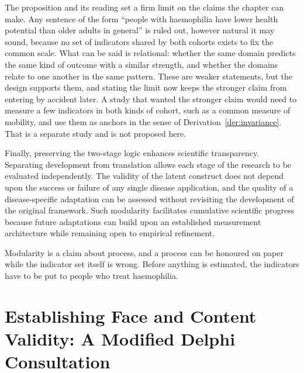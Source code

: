 The proposition and its reading set a firm limit on the claims the chapter can make. Any sentence of the form ``people with haemophilia have lower health potential than older adults in general'' is ruled out, however natural it may sound, because no set of indicators shared by both cohorts exists to fix the common scale. What can be said is relational: whether the same domain predicts the same kind of outcome with a similar strength, and whether the domains relate to one another in the same pattern. These are weaker statements, but the design supports them, and stating the limit now keeps the stronger claim from entering by accident later. A study that wanted the stronger claim would need to measure a few indicators in both kinds of cohort, such as a common measure of mobility, and use them as anchors in the sense of Derivation~\ref{der:invariance}. That is a separate study and is not proposed here.

Finally, preserving the two-stage logic enhances scientific transparency. Separating development from translation allows each stage of the research to be evaluated independently. The validity of the latent construct does not depend upon the success or failure of any single disease application, and the quality of a disease-specific adaptation can be assessed without revisiting the development of the original framework. Such modularity facilitates cumulative scientific progress because future adaptations can build upon an established measurement architecture while remaining open to empirical refinement.

Modularity is a claim about process, and a process can be honoured on paper
while the indicator set itself is wrong. Before anything is estimated, the
indicators have to be put to people who treat haemophilia.

\section{Establishing Face and Content Validity: A Modified Delphi Consultation}
\label{sec:delphi}

